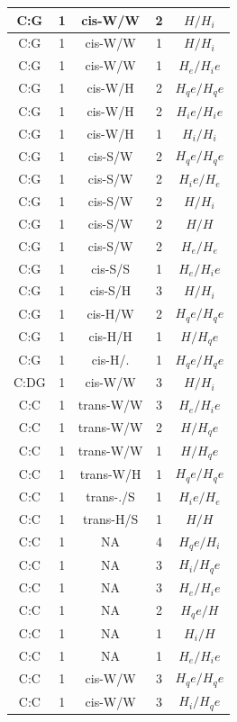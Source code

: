 \begin{center}
\begin{longtable}{c|c|c|c|c}
C:G & 1 & cis-W/W & 2 & $H/H_i$ \\  \hline
C:G & 1 & cis-W/W & 1 & $H/H_i$ \\  \hline
C:G & 1 & cis-W/W & 1 & $H_e/H_ie$ \\  \hline
C:G & 1 & cis-W/H & 2 & $H_qe/H_qe$ \\  \hline
C:G & 1 & cis-W/H & 2 & $H_ie/H_ie$ \\  \hline
C:G & 1 & cis-W/H & 1 & $H_i/H_i$ \\  \hline
C:G & 1 & cis-S/W & 2 & $H_qe/H_qe$ \\  \hline
C:G & 1 & cis-S/W & 2 & $H_ie/H_e$ \\  \hline
C:G & 1 & cis-S/W & 2 & $H/H_i$ \\  \hline
C:G & 1 & cis-S/W & 2 & $H/H$ \\  \hline
C:G & 1 & cis-S/W & 2 & $H_e/H_e$ \\  \hline
C:G & 1 & cis-S/S & 1 & $H_e/H_ie$ \\  \hline
C:G & 1 & cis-S/H & 3 & $H/H_i$ \\  \hline
C:G & 1 & cis-H/W & 2 & $H_qe/H_qe$ \\  \hline
C:G & 1 & cis-H/H & 1 & $H/H_qe$ \\  \hline
C:G & 1 & cis-H/. & 1 & $H_qe/H_qe$ \\  \hline
C:DG & 1 & cis-W/W & 3 & $H/H_i$ \\  \hline
C:C & 1 & trans-W/W & 3 & $H_e/H_ie$ \\  \hline
C:C & 1 & trans-W/W & 2 & $H/H_qe$ \\  \hline
C:C & 1 & trans-W/W & 1 & $H/H_qe$ \\  \hline
C:C & 1 & trans-W/H & 1 & $H_qe/H_qe$ \\  \hline
C:C & 1 & trans-./S & 1 & $H_ie/H_e$ \\  \hline
C:C & 1 & trans-H/S & 1 & $H/H$ \\  \hline
C:C & 1 & NA & 4 & $H_qe/H_i$ \\  \hline
C:C & 1 & NA & 3 & $H_i/H_qe$ \\  \hline
C:C & 1 & NA & 3 & $H_e/H_ie$ \\  \hline
C:C & 1 & NA & 2 & $H_qe/H$ \\  \hline
C:C & 1 & NA & 1 & $H_i/H$ \\  \hline
C:C & 1 & NA & 1 & $H_e/H_ie$ \\  \hline
C:C & 1 & cis-W/W & 3 & $H_qe/H_qe$ \\  \hline
C:C & 1 & cis-W/W & 3 & $H_i/H_qe$ \\  \hline

\end{longtable}
\end{center}
